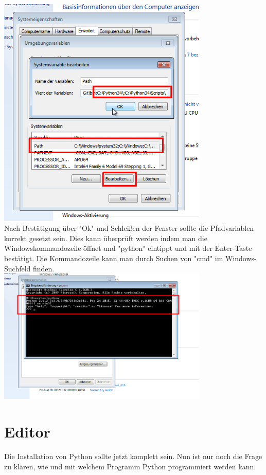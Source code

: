 \documentclass[ngerman,oneside, a4letter]{scrbook}
\begin{document}
\includegraphics[width=100mm]{bilder/python_path}
\\
Nach Bestätigung über "Ok" und Schleißen der Fenster sollte die Pfadvariablen korrekt gesetzt sein. Dies kann überprüft werden indem man die Windowskommandozeile  öffnet und "python" eintippt und mit der Enter-Taste bestätigt. Die Kommandozeile kann man durch Suchen von "cmd" im Windows-Suchfeld finden.
\\
\includegraphics[width=100mm]{bilder/cmd_python}
\clearpage

\section{Editor}
Die Installation von Python sollte jetzt komplett sein. Nun ist nur noch die Frage zu klären, wie und mit welchem Programm Python programmiert werden kann.
\\
\end{document}
